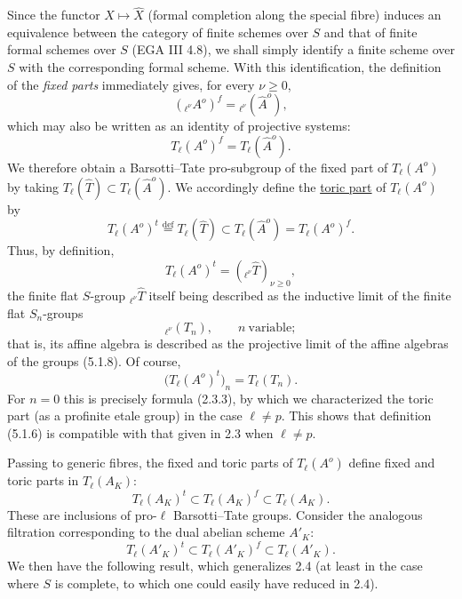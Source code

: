Since the functor $X\longmapsto\widehat X$ (formal completion along the
special fibre) induces an equivalence between the category of finite
schemes over $S$ and that of finite formal schemes over $S$ (EGA III
4.8), we shall simply identify a finite scheme over $S$ with the
corresponding formal scheme.  With this identification, the definition
of the \emph{fixed parts} immediately gives, for every $\nu\geq0$,
\begin{equation}\tag{5.1.4}
 ({}_{\ell^\nu}A^o)^f={}_{\ell^\nu}(\widehat A^o),
\end{equation}
which may also be written as an identity of projective systems:
\begin{equation}\tag{5.1.5}
 T_\ell(A^o)^f=T_\ell(\widehat A^o).
\end{equation}
We therefore obtain a Barsotti--Tate pro-subgroup of the fixed part of
$T_\ell(A^o)$ by taking
$T_\ell(\widehat T)\subset T_\ell(\widehat A^o)$.  We accordingly
define the \underline{toric part} of $T_\ell(A^o)$ by
\begin{equation}\tag{5.1.6}
 T_\ell(A^o)^t
 \stackrel{\mathrm{def}}{=}
 T_\ell(\widehat T)
 \subset T_\ell(\widehat A^o)
 =T_\ell(A^o)^f.
\end{equation}
Thus, by definition,
\begin{equation}\tag{5.1.7}
 T_\ell(A^o)^t=({}_{\ell^\nu}\widehat T)_{\nu\geq0},
\end{equation}
the finite flat $S$-group ${}_{\ell^\nu}\widehat T$ itself being
described as the inductive limit of the finite flat $S_n$-groups
\begin{equation}\tag{5.1.8}
 {}_{\ell^\nu}(T_n),\qquad n\ \text{variable};
\end{equation}
that is, its affine algebra is described as the projective limit of the
affine algebras of the groups (5.1.8).  Of course,
\begin{equation}\tag{5.1.9}
 \bigl(T_\ell(A^o)^t\bigr)_n=T_\ell(T_n).
\end{equation}
For $n=0$ this is precisely formula (2.3.3), by which we characterized
the toric part (as a profinite etale group) in the case $\ell\neq p$.
This shows that definition (5.1.6) is compatible with that given in
2.3 when $\ell\neq p$.

Passing to generic fibres, the fixed and toric parts of $T_\ell(A^o)$
define fixed and toric parts in $T_\ell(A_K)$:
\begin{equation}\tag{5.1.10}
 T_\ell(A_K)^t\subset T_\ell(A_K)^f\subset T_\ell(A_K).
\end{equation}
These are inclusions of pro-$\ell$ Barsotti--Tate groups.  Consider the
analogous filtration corresponding to the dual abelian scheme $A'_K$:
\begin{equation}\tag{5.1.11}
 T_\ell(A'_K)^t\subset T_\ell(A'_K)^f\subset T_\ell(A'_K).
\end{equation}
We then have the following result, which generalizes 2.4 (at least in
the case where $S$ is complete, to which one could easily have reduced
in 2.4).

